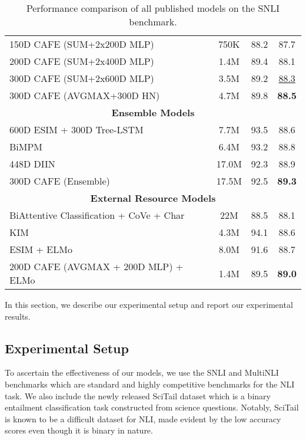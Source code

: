 \documentclass[11pt,a4paper]{article}
\begin{document}
\begin{table*}[ht]
\begin{tabular}{|l|ccc|}
    \hline
    150D \textsc{CAFE} (SUM+2x200D MLP)  & 750K & 88.2 & 87.7 \\
    200D \textsc{CAFE} (SUM+2x400D MLP)  & 1.4M & 89.4 & 88.1 \\
    300D \textsc{CAFE} (SUM+2x600D MLP)  & 3.5M & 89.2&  \underline{88.3}\\
    300D \textsc{CAFE} (AVGMAX+300D HN)  & 4.7M &89.8 &  \textbf{88.5}\\
    \hline
    \multicolumn{4}{|c|}{\textbf{Ensemble Models}} \\
    \hline
    600D ESIM + 300D Tree-LSTM \cite{DBLP:conf/acl/ChenZLWJI17}  & 7.7M & 93.5 & 88.6 \\
    BiMPM \cite{DBLP:conf/ijcai/WangHF17}  & 6.4M  & 93.2 & 88.8 \\
    448D DIIN \cite{DBLP:journals/corr/abs-1709-04348} & 17.0M   & 92.3 &  88.9 \\
    300D \textsc{CAFE} (Ensemble) & 17.5M   & 92.5 & \textbf{89.3} \\
    \hline
     \multicolumn{4}{|c|}{\textbf{External Resource Models}} \\
     \hline
      BiAttentive Classification + CoVe + Char \cite{mccann2017learned} & 22M & 88.5 & 88.1 \\
     KIM \cite{chen2017natural} & 4.3M& 94.1 & 88.6\\
     ESIM + ELMo \cite{peters2018deep} & 8.0M & 91.6 & 88.7 \\
         200D \textsc{CAFE} (AVGMAX + 200D MLP) + ELMo & 1.4M & 89.5 & \textbf{89.0} \\
\hline


    \end{tabular}\caption{Performance comparison of all published models on the SNLI benchmark.}
  \label{tab:snli_results}\end{table*}

In this section, we describe our experimental setup and report our experimental results.
\subsection{Experimental Setup}
To ascertain the effectiveness of our models, we use the SNLI \cite{DBLP:conf/emnlp/BowmanAPM15} and MultiNLI \cite{DBLP:journals/corr/WilliamsNB17} benchmarks which are standard and highly competitive benchmarks for the NLI task. We also include the newly released SciTail dataset \cite{scitail} which is a binary entailment classification task constructed from science questions. Notably, SciTail is known to be a difficult dataset for NLI, made evident by the low accuracy scores even though it is binary in nature.
\end{document}
